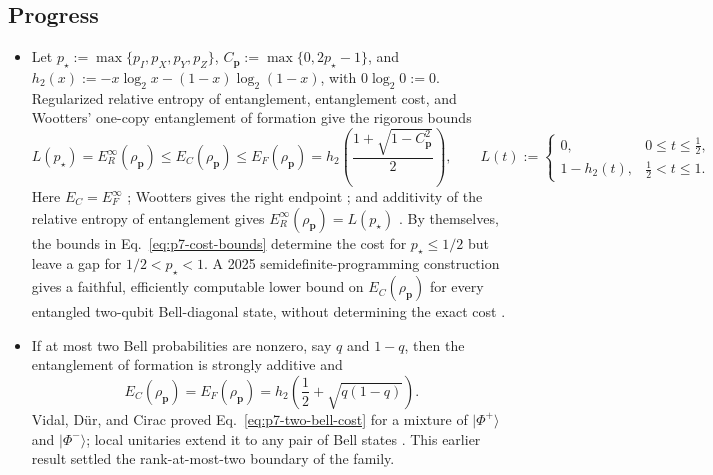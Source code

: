 \subsection*{Progress}

\begin{itemize}
  \item Let $p_\star:=\max\{p_I,p_X,p_Y,p_Z\}$,
  $C_{\mathbf p}:=\max\{0,2p_\star-1\}$, and
  $h_2(x):=-x\log_2x-(1-x)\log_2(1-x)$, with $0\log_2 0:=0$.  Regularized relative entropy of
  entanglement, entanglement cost, and Wootters' one-copy entanglement of
  formation give the rigorous bounds
  \begin{equation}
    L(p_\star)=E_R^\infty(\rho_{\mathbf p})
    \leq E_C(\rho_{\mathbf p})
    \leq E_F(\rho_{\mathbf p})
    =h_2\!\left(\frac{1+\sqrt{1-C_{\mathbf p}^{2}}}{2}\right),
    \qquad
    L(t):=
    \begin{cases}
      0, & 0\leq t\leq\tfrac12,\\
      1-h_2(t), & \tfrac12<t\leq1.
    \end{cases}
    \label{eq:p7-cost-bounds}
  \end{equation}
  Here $E_C=E_F^\infty$
  ; Wootters gives the
  right endpoint ; and additivity of the
  relative entropy of entanglement gives
  $E_R^\infty(\rho_{\mathbf p})=L(p_\star)$
  .  By themselves,
  the bounds in Eq.~\eqref{eq:p7-cost-bounds} determine the cost for
  $p_\star\leq1/2$ but leave a gap for $1/2<p_\star<1$.
  A 2025 semidefinite-programming construction gives a faithful,
  efficiently computable lower bound on $E_C(\rho_{\mathbf p})$ for every
  entangled two-qubit Bell-diagonal state, without determining the exact cost
  .

  \item If at most two Bell probabilities are nonzero, say $q$ and
  $1-q$, then the entanglement of formation is strongly additive and
  \begin{equation}
    E_C(\rho_{\mathbf p})=E_F(\rho_{\mathbf p})
    =h_2\!\left(\frac12+\sqrt{q(1-q)}\right).
    \label{eq:p7-two-bell-cost}
  \end{equation}
  Vidal, D\"ur, and Cirac proved Eq.~\eqref{eq:p7-two-bell-cost} for a
  mixture of $\lvert\Phi^+\rangle$ and $\lvert\Phi^-\rangle$; local
  unitaries extend it to any pair of Bell states
  .  This earlier result settled the rank-at-most-two
  boundary of the family.


\end{itemize}
